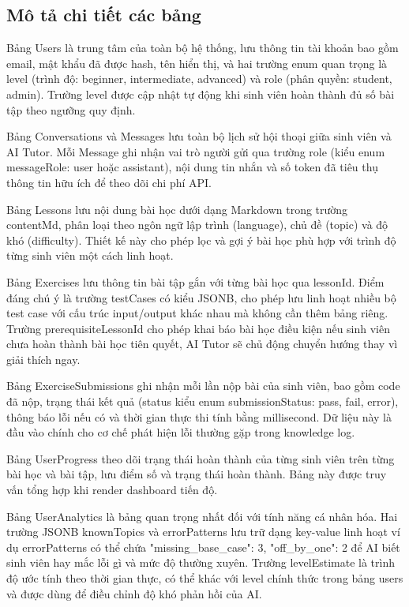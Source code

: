 \documentclass[../main.tex]{subfiles}
\begin{document}
\subsection{Mô tả chi tiết các bảng}

Bảng Users là trung tâm của toàn bộ hệ thống, lưu thông tin tài khoản bao gồm email, mật khẩu đã được hash, tên hiển thị, và hai trường enum quan trọng là level (trình độ: beginner, intermediate, advanced) và role (phân quyền: student, admin). Trường level được cập nhật tự động khi sinh viên hoàn thành đủ số bài tập theo ngưỡng quy định.

Bảng Conversations và Messages lưu toàn bộ lịch sử hội thoại giữa sinh viên và AI Tutor. Mỗi Message ghi nhận vai trò người gửi qua trường role (kiểu enum messageRole: user hoặc assistant), nội dung tin nhắn và số token đã tiêu thụ thông tin hữu ích để theo dõi chi phí API.

Bảng Lessons lưu nội dung bài học dưới dạng Markdown trong trường contentMd, phân loại theo ngôn ngữ lập trình (language), chủ đề (topic) và độ khó (difficulty). Thiết kế này cho phép lọc và gợi ý bài học phù hợp với trình độ từng sinh viên một cách linh hoạt.

Bảng Exercises lưu thông tin bài tập gắn với từng bài học qua lessonId. Điểm đáng chú ý là trường testCases có kiểu JSONB, cho phép lưu linh hoạt nhiều bộ test case với cấu trúc input/output khác nhau mà không cần thêm bảng riêng. Trường prerequisiteLessonId cho phép khai báo bài học điều kiện nếu sinh viên chưa hoàn thành bài học tiên quyết, AI Tutor sẽ chủ động chuyển hướng thay vì giải thích ngay.

Bảng ExerciseSubmissions ghi nhận mỗi lần nộp bài của sinh viên, bao gồm code đã nộp, trạng thái kết quả (status kiểu enum submissionStatus: pass, fail, error), thông báo lỗi nếu có và thời gian thực thi tính bằng millisecond. Dữ liệu này là đầu vào chính cho cơ chế phát hiện lỗi thường gặp trong knowledge log.

Bảng UserProgress theo dõi trạng thái hoàn thành của từng sinh viên trên từng bài học và bài tập, lưu điểm số và trạng thái hoàn thành. Bảng này được truy vấn tổng hợp khi render dashboard tiến độ.

Bảng UserAnalytics là bảng quan trọng nhất đối với tính năng cá nhân hóa. Hai trường JSONB knownTopics và errorPatterns lưu trữ dạng key-value linh hoạt ví dụ errorPatterns có thể chứa {"missing\_base\_case": 3, "off\_by\_one": 2} để AI biết sinh viên hay mắc lỗi gì và mức độ thường xuyên. Trường levelEstimate là trình độ ước tính theo thời gian thực, có thể khác với level chính thức trong bảng users và được dùng để điều chỉnh độ khó phản hồi của AI.
\end{document}
